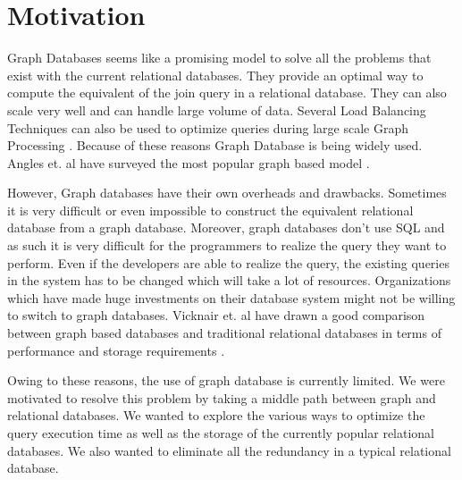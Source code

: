 \documentclass[12pt, oneside]{book}
\begin{document}
\section{Motivation}
Graph Databases seems like a promising model to solve all the problems that exist with the current relational databases. They provide an optimal way to compute the equivalent of the join query in a relational database. They can also scale very well and can handle large volume of data. Several Load Balancing Techniques can also be used to optimize queries during large scale Graph Processing \cite{load_balancing}. Because of these reasons Graph Database is being widely used. Angles et. al have surveyed the most popular graph based model \cite{graph_database_survey}. \\ \par
However, Graph databases have their own overheads and drawbacks. Sometimes it is very difficult or even impossible to construct the equivalent relational database from a graph database. Moreover, graph databases don't use SQL and as such it is very difficult for the programmers to realize the query they want to perform. Even if the developers are able to realize the query, the existing queries in the system has to be changed which will take a lot of resources. Organizations which have made huge investments on their database system might not be willing to switch to graph databases. Vicknair et. al have drawn a good comparison between graph based databases and traditional relational databases in terms of performance and storage requirements \cite{graph_relational_comparison}. \\ \par
Owing to these reasons, the use of graph database is currently limited. We were motivated to resolve this problem by taking a middle path between graph and relational databases. We wanted to explore the various ways to optimize the query execution time as well as the storage of the currently popular relational databases. We also wanted to eliminate all the redundancy in a typical relational database.
\end{document}
